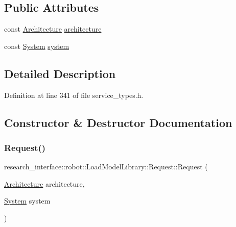 \subsection*{Public Attributes}
\begin{DoxyCompactItemize}
\item 
const \hyperlink{structresearch__interface_1_1robot_1_1LoadModelLibrary_a89a2ad9a252c52861614214df33511f8}{Architecture} \hyperlink{structresearch__interface_1_1robot_1_1LoadModelLibrary_1_1Request_a4b22348dd3f368d9c2597e1f07cdccb5}{architecture}
\item 
const \hyperlink{structresearch__interface_1_1robot_1_1LoadModelLibrary_a64b0f0f01e8f2716ef4c2478037559eb}{System} \hyperlink{structresearch__interface_1_1robot_1_1LoadModelLibrary_1_1Request_a7d34eb1951a91b5a512cae693e1f77a9}{system}
\end{DoxyCompactItemize}


\subsection{Detailed Description}


Definition at line 341 of file service\+\_\+types.\+h.



\subsection{Constructor \& Destructor Documentation}
\mbox{\label{structresearch__interface_1_1robot_1_1LoadModelLibrary_1_1Request_a56df74b54d4b80b4f02562df80aa5e24}} 
\subsubsection{\texorpdfstring{Request()}{Request()}}
{\footnotesize\ttfamily research\+\_\+interface\+::robot\+::\+Load\+Model\+Library\+::\+Request\+::\+Request (\begin{DoxyParamCaption}\item[{\hyperlink{structresearch__interface_1_1robot_1_1LoadModelLibrary_a89a2ad9a252c52861614214df33511f8}{Architecture}}]{architecture,  }\item[{\hyperlink{structresearch__interface_1_1robot_1_1LoadModelLibrary_a64b0f0f01e8f2716ef4c2478037559eb}{System}}]{system }\end{DoxyParamCaption})\hspace{0.3cm}{\ttfamily [inline]}}



